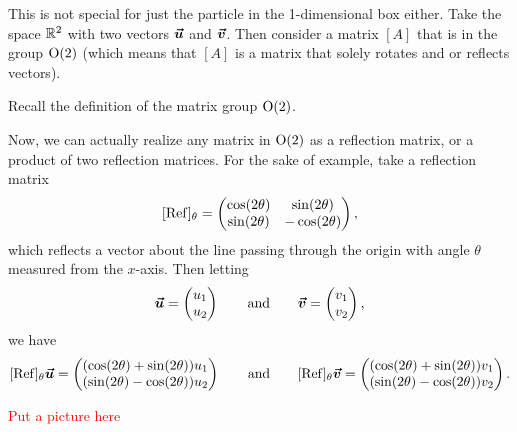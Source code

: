 This is not special for just the particle in the 1-dimensional box either. Take the space $\mathbb{R}^2$ with two vectors $\boldsymbol{\boldsymbol{\vec{u}}}$ and $\boldsymbol{\boldsymbol{\vec{v}}}$. Then consider a matrix $[A]$ that is in the group $\mathrm{O}(2)$ (which means that $[A]$ is a matrix that solely rotates and or reflects vectors).
\begin{exercise}
	Recall the definition of the matrix group $\mathrm{O}(2)$.
\end{exercise}
Now, we can actually realize any matrix in $\mathrm{O}(2)$ as a reflection matrix, or a product of two reflection matrices. For the sake of example, take a reflection matrix
\[
[\mathrm{Ref}]_\theta = \begin{pmatrix} \cos (2\theta) & \sin(2\theta) \\ \sin(2\theta) & -\cos(2\theta) \end{pmatrix},
\]
which reflects a vector about the line passing through the origin with angle $\theta$ measured from the $x$-axis.  Then letting
\[
\boldsymbol{\boldsymbol{\vec{u}}} = \begin{pmatrix} u_1 \\ u_2 \end{pmatrix} \qquad \textrm{and} \qquad \boldsymbol{\boldsymbol{\vec{v}}} = \begin{pmatrix} v_1 \\ v_2 \end{pmatrix},
\]
 we have
\[
[\mathrm{Ref}]_\theta \boldsymbol{\boldsymbol{\vec{u}}} = \begin{pmatrix} (\cos(2\theta)+\sin(2\theta))u_1 \\  (\sin(2\theta) - \cos(2\theta))u_2\end{pmatrix} \qquad \textrm{and} \qquad [\mathrm{Ref}]_\theta \boldsymbol{\boldsymbol{\vec{v}}} = \begin{pmatrix} (\cos(2\theta)+\sin(2\theta))v_1 \\  (\sin(2\theta) - \cos(2\theta))v_2\end{pmatrix}.
\]

\textcolor{red}{Put a picture here}